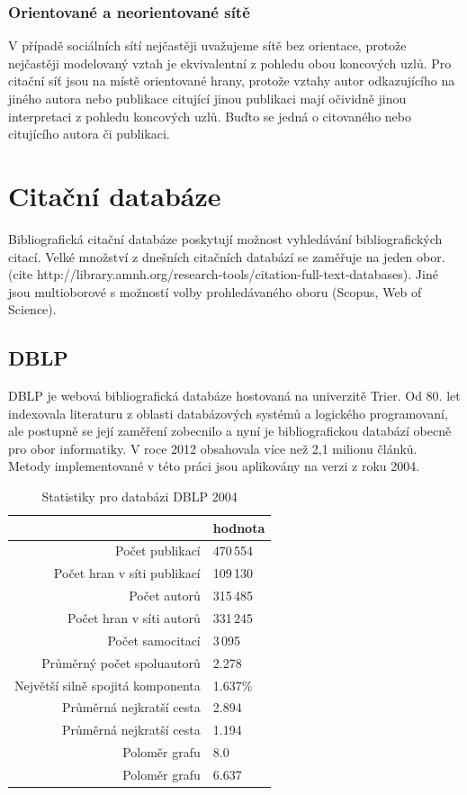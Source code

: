 \documentclass{bakalarka}
\begin{document}
\subsection{Orientované a neorientované sítě}
V případě sociálních sítí nejčastěji uvažujeme sítě bez orientace, protože
nejčastěji modelovaný vztah  je ekvivalentní z pohledu obou
koncových uzlů. Pro citační síť jsou na místě orientované hrany, protože vztahy
autor odkazujícího na jiného autora nebo publikace citující jinou publikaci
mají očividně jinou interpretaci z pohledu koncových uzlů. Buďto se jedná o
citovaného nebo citujícího autora či publikaci.


\chapter{Citační databáze}
Bibliografická citační databáze poskytují možnost vyhledávání bibliografických
citací. Velké množství z dnešních citačních databází se zaměřuje na jeden obor.
(cite http://library.amnh.org/research-tools/citation-full-text-databases).
Jiné jsou multioborové s možností volby prohledávaného oboru (Scopus, Web of
Science).

\section{DBLP}
DBLP \cite{DBLP} je webová bibliografická databáze hostovaná na univerzitě
Trier. Od 80.  let indexovala literaturu z oblasti databázových systémů a
logického programovaní, ale postupně se její zaměření zobecnilo a nyní je
bibliografickou databází obecně pro obor informatiky. 
V roce 2012 obsahovala více než 2,1 milionu článků. Metody implementované v
této práci jsou aplikovány na verzi z roku 2004. 

\begin{table}[!ht]
\begin{center}
\begin{tabular}{r|l}
\toprule
& hodnota \\
\midrule
Počet publikací & 470\,554 \\
Počet hran v síti publikací & 109\,130 \\
Počet autorů & 315\,485 \\
Počet hran v síti autorů & 331\,245 \\
Počet samocitací & 3\,095 \\
Průměrný počet spoluautorů & 2.278 \\
Největší silně spojitá komponenta & 1.637\% \\
Průměrná nejkratší cesta\footnotemark[1] & 2.894 \\
Průměrná nejkratší cesta\footnotemark[2] & 1.194 \\
Poloměr grafu\footnotemark[1] & 8.0 \\
Poloměr grafu\footnotemark[2] & 6.637 \\
\bottomrule
\end{tabular}
\caption{Statistiky pro databázi DBLP 2004}
\label{tab:dblpstat}
\end{center}
\end{table}
\end{document}
